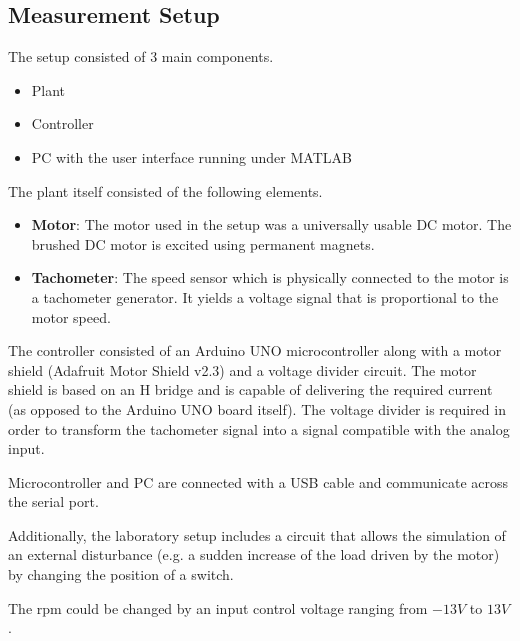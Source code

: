 \subsection{Measurement Setup}

The setup consisted of 3 main components.

\begin{itemize}
    \item Plant
    \item Controller
    \item PC with the user interface running under MATLAB
\end{itemize}

The plant itself consisted of the following elements.

\begin{itemize}
    \item \textbf{Motor}: The motor used in the setup was a universally usable DC motor. The brushed DC motor is excited using permanent magnets.
    \item \textbf{Tachometer}: The speed sensor which is physically connected to the motor is a tachometer generator. It yields a voltage signal that is proportional to the motor speed.
\end{itemize}

The controller consisted of an Arduino UNO  microcontroller along with a motor
shield (Adafruit Motor Shield v2.3) and a  voltage  divider circuit. The motor
shield is  based  on  an  H  bridge  and is capable of delivering the required
current (as opposed to the Arduino UNO board itself).  The  voltage divider is
required in order to transform the tachometer  signal into a signal compatible
with the analog input.

Microcontroller and PC are connected with a  USB  cable and communicate across
the serial port.

Additionally,  the  laboratory  setup  includes  a  circuit  that  allows  the
simulation of an external  disturbance  (e.g.  a  sudden  increase of the load
driven by the motor) by changing the position of a switch.

The  rpm could be changed by an input control voltage ranging from  $-13V$  to
$13V$.

